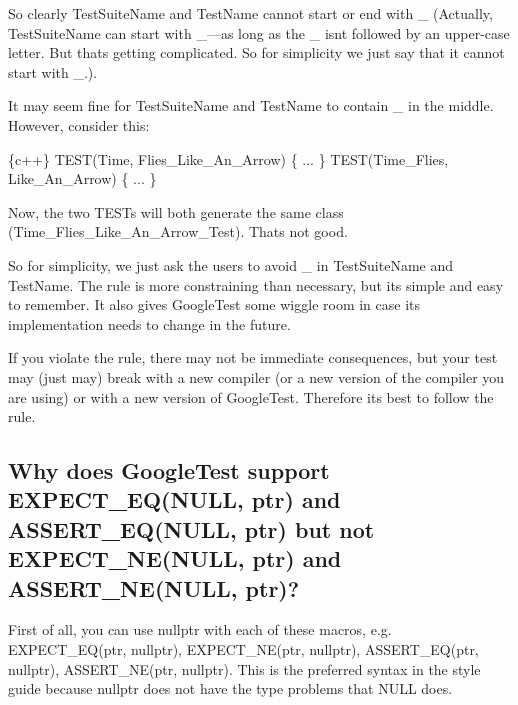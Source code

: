 So clearly {\ttfamily Test\+Suite\+Name} and {\ttfamily Test\+Name} cannot start or end with {\ttfamily \+\_\+} (Actually, {\ttfamily Test\+Suite\+Name} can start with {\ttfamily \+\_\+}—as long as the {\ttfamily \+\_\+} isn\textquotesingle{}t followed by an upper-\/case letter. But that\textquotesingle{}s getting complicated. So for simplicity we just say that it cannot start with {\ttfamily \+\_\+}.).

It may seem fine for {\ttfamily Test\+Suite\+Name} and {\ttfamily Test\+Name} to contain {\ttfamily \+\_\+} in the middle. However, consider this\+:


\begin{DoxyCode}
\{c++\}
TEST(Time, Flies\_Like\_An\_Arrow) \{ ... \}
TEST(Time\_Flies, Like\_An\_Arrow) \{ ... \}
\end{DoxyCode}


Now, the two {\ttfamily T\+E\+ST}s will both generate the same class ({\ttfamily Time\+\_\+\+Flies\+\_\+\+Like\+\_\+\+An\+\_\+\+Arrow\+\_\+\+Test}). That\textquotesingle{}s not good.

So for simplicity, we just ask the users to avoid {\ttfamily \+\_\+} in {\ttfamily Test\+Suite\+Name} and {\ttfamily Test\+Name}. The rule is more constraining than necessary, but it\textquotesingle{}s simple and easy to remember. It also gives Google\+Test some wiggle room in case its implementation needs to change in the future.

If you violate the rule, there may not be immediate consequences, but your test may (just may) break with a new compiler (or a new version of the compiler you are using) or with a new version of Google\+Test. Therefore it\textquotesingle{}s best to follow the rule.

\subsection*{Why does Google\+Test support {\ttfamily E\+X\+P\+E\+C\+T\+\_\+\+E\+Q(\+N\+U\+L\+L, ptr)} and {\ttfamily A\+S\+S\+E\+R\+T\+\_\+\+E\+Q(\+N\+U\+L\+L, ptr)} but not {\ttfamily E\+X\+P\+E\+C\+T\+\_\+\+N\+E(\+N\+U\+L\+L, ptr)} and {\ttfamily A\+S\+S\+E\+R\+T\+\_\+\+N\+E(\+N\+U\+L\+L, ptr)}?}

First of all, you can use {\ttfamily nullptr} with each of these macros, e.\+g. {\ttfamily E\+X\+P\+E\+C\+T\+\_\+\+E\+Q(ptr, nullptr)}, {\ttfamily E\+X\+P\+E\+C\+T\+\_\+\+N\+E(ptr, nullptr)}, {\ttfamily A\+S\+S\+E\+R\+T\+\_\+\+E\+Q(ptr, nullptr)}, {\ttfamily A\+S\+S\+E\+R\+T\+\_\+\+N\+E(ptr, nullptr)}. This is the preferred syntax in the style guide because {\ttfamily nullptr} does not have the type problems that {\ttfamily N\+U\+LL} does.

